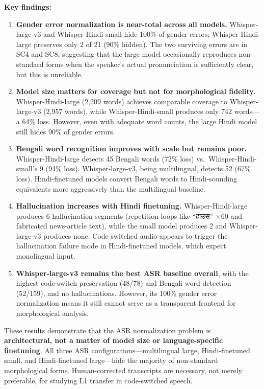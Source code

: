 \documentclass[11pt,a4paper]{report}
\newcommand{\deva}[1]{{\devafont #1}}
\newcommand{\deva}[1]{\textit{[Devanagari]}}
\begin{document}
\textbf{Key findings:}
\begin{enumerate}
  \item \textbf{Gender error normalization is near-total across all models.} Whisper-large-v3 and Whisper-Hindi-small hide 100\% of gender errors; Whisper-Hindi-large preserves only 2 of 21 (90\% hidden). The two surviving errors are in SC4 and SC8, suggesting that the large model occasionally reproduces non-standard forms when the speaker's actual pronunciation is sufficiently clear, but this is unreliable.

  \item \textbf{Model size matters for coverage but not for morphological fidelity.} Whisper-Hindi-large (2,209 words) achieves comparable coverage to Whisper-large-v3 (2,957 words), while Whisper-Hindi-small produces only 742 words---a 64\% loss. However, even with adequate word counts, the large Hindi model still hides 90\% of gender errors.

  \item \textbf{Bengali word recognition improves with scale but remains poor.} Whisper-Hindi-large detects 45 Bengali words (72\% loss) vs.\ Whisper-Hindi-small's 9 (94\% loss). Whisper-large-v3, being multilingual, detects 52 (67\% loss). Hindi-finetuned models convert Bengali words to Hindi-sounding equivalents more aggressively than the multilingual baseline.

  \item \textbf{Hallucination increases with Hindi finetuning.} Whisper-Hindi-large produces 6 hallucination segments (repetition loops like ``\deva{हाउस}'' $\times$60 and fabricated news-article text), while the small model produces 2 and Whisper-large-v3 produces none. Code-switched audio appears to trigger the hallucination failure mode in Hindi-finetuned models, which expect monolingual input.

  \item \textbf{Whisper-large-v3 remains the best ASR baseline overall}, with the highest code-switch preservation (48/78) and Bengali word detection (52/159), and no hallucinations. However, its 100\% gender error normalization means it still cannot serve as a transparent frontend for morphological analysis.
\end{enumerate}

These results demonstrate that the ASR normalization problem is \textbf{architectural, not a matter of model size or language-specific finetuning}. All three ASR configurations---multilingual large, Hindi-finetuned small, and Hindi-finetuned large---hide the majority of non-standard morphological forms. Human-corrected transcripts are necessary, not merely preferable, for studying L1 transfer in code-switched speech.
\end{document}

